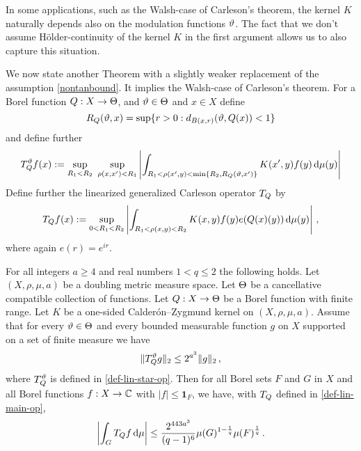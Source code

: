 In some applications, such as the Walsh-case of Carleson's theorem, the kernel $K$ naturally depends also on the modulation functions ${\vartheta}$.
The fact that we don't assume H\"older-continuity of the kernel $K$ in the first argument allows us to also capture this situation.

We now state another Theorem with a slightly weaker replacement of the assumption \eqref{nontanbound}.
It implies the Walsh-case of Carleson's theorem.
For a Borel function ${Q}:X\to {\Theta}$, and ${\vartheta} \in {\Theta}$ and $x\in X$ define
\begin{equation}
    R_{{Q}}({\vartheta},x)=\sup\{r>0:d_{B(x,r)}({\vartheta}, {Q}(x))<1\}
\end{equation}
and define further
\begin{equation}
    \label{def-lin-star-op}
    T_{{Q}}^{\vartheta} f(x):=\sup_{R_1<R_2} \ \sup_{\rho(x,x')<R_1}
    \left|\int_{R_1< \rho(x',y) < \min\{R_2, R_{{Q}}({\vartheta},x')\}} K(x',y) f(y) \, \mathrm{d}\mu(y) \right|
\end{equation}
Define further the linearized generalized Carleson operator $T_{Q}$ by
\begin{equation}
    \label{def-lin-main-op}
    T_{Q} f(x):= \sup_{0 < R_1 < R_2}\left| \int_{R_1 < \rho(x,y) < R_2} K(x,y) f(y) e({Q}(x)(y)) \, \mathrm{d}\mu(y) \right|\, ,
\end{equation}
where again $e(r)=e^{ir}$.

\begin{theorem}
\label{linearised-metric-Carleson}
\leanok
{}
    For all integers $a \ge 4$ and real numbers $1<q\le 2$ the following holds.
    Let $(X,\rho,\mu,a)$ be a doubling metric measure space. Let ${\Theta}$ be a
    cancellative compatible collection of functions.
    Let ${Q}:X\to {\Theta}$ be a Borel function with finite range.
    Let $K$ be a one-sided Calder\'on--Zygmund kernel on $(X,\rho,\mu,a)$. Assume that for every ${\vartheta}\in {\Theta}$ and every bounded measurable function $g$ on $X$ supported on a set of finite measure we have
    \begin{equation}\label{linnontanbound}
        \|T_{{Q}}^{\vartheta} g\|_{2} \leq 2^{a^3} \|g\|_2\,,
    \end{equation}
    where $T_{{Q}}^{\vartheta}$ is defined in \eqref{def-lin-star-op}.
    Then for all Borel sets $F$ and $G$ in $X$ and all Borel functions $f:X\to \mathbb{C}$ with
    $|f|\le \mathbf{1}_F$, we have, with $T_{Q}$ defined in \eqref{def-lin-main-op},
    \begin{equation}
        \label{linresweak}
        \left|\int_{G} T_{Q} f \, \mathrm{d}\mu\right| \le \frac{2^{443a^3}}{(q-1)^6} \mu(G)^{1-\frac{1}{q}} \mu(F)^{\frac{1}{q}}\, .
    \end{equation}
\end{theorem}

